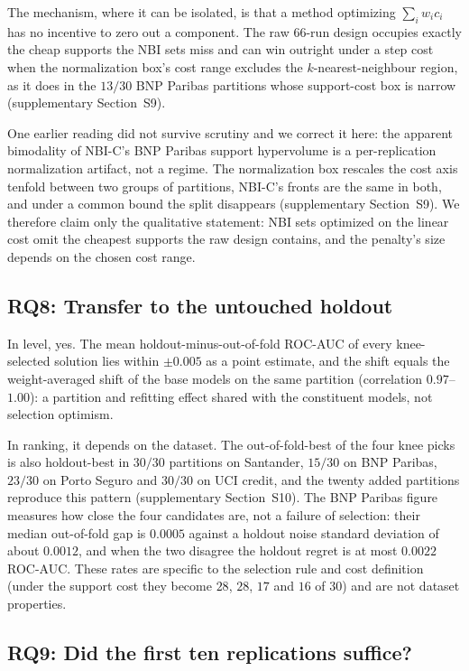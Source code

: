 The mechanism, where it can be isolated, is that a method optimizing $\sum_i w_i c_i$ has no incentive to zero out a
component. The raw 66-run design occupies exactly the cheap supports the NBI sets miss and can win outright under a
step cost when the normalization box's cost range excludes the $k$-nearest-neighbour region, as it does in the $13/30$
BNP Paribas partitions whose support-cost box is narrow (supplementary Section~S9).

One earlier reading did not survive scrutiny and we correct it here: the apparent bimodality of NBI-C's BNP Paribas
support hypervolume is a per-replication normalization artifact, not a regime. The normalization box rescales the
cost axis tenfold between two groups of partitions, NBI-C's fronts are the same in both, and under a common bound the
split disappears (supplementary Section~S9). We therefore claim only the qualitative statement: NBI sets optimized on
the linear cost omit the cheapest supports the raw design contains, and the penalty's size depends on the chosen cost
range.

\subsection{RQ8: Transfer to the untouched holdout}
\label{sec:results:holdout}

In level, yes. The mean holdout-minus-out-of-fold ROC-AUC of every knee-selected solution lies within $\pm 0.005$ as a
point estimate, and the shift equals the weight-averaged shift of the base models on the same partition (correlation
$0.97$--$1.00$): a partition and refitting effect shared with the constituent models, not selection optimism.

In ranking, it depends on the dataset. The out-of-fold-best of the four knee picks is also holdout-best in $30/30$
partitions on Santander, $15/30$ on BNP Paribas, $23/30$ on Porto Seguro and $30/30$ on UCI credit, and the twenty
added partitions reproduce this pattern (supplementary Section~S10). The BNP Paribas figure measures how close the
four candidates are, not a failure of selection: their median out-of-fold gap is $0.0005$ against a holdout noise
standard deviation of about $0.0012$, and when the two disagree the holdout regret is at most $0.0022$ ROC-AUC. These
rates are specific to the selection rule and cost definition (under the support cost they become $28$, $28$, $17$
and $16$ of 30) and are not dataset properties.

\subsection{RQ9: Did the first ten replications suffice?}
\label{sec:results:r30}

